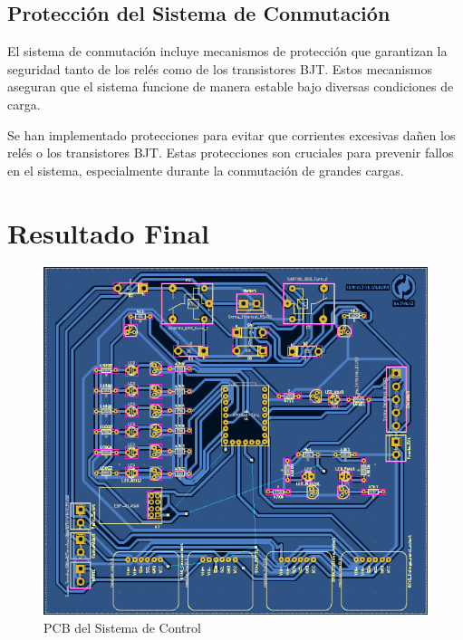             \subsection{Protección del Sistema de Conmutación}
                El sistema de conmutación incluye mecanismos de protección que garantizan la seguridad tanto de los relés como de los transistores BJT. Estos mecanismos aseguran que el sistema funcione de manera estable bajo diversas condiciones de carga.\par
                Se han implementado protecciones para evitar que corrientes excesivas dañen los relés o los transistores BJT. Estas protecciones son cruciales para prevenir fallos en el sistema, especialmente durante la conmutación de grandes cargas.\par
            
        \section{Resultado Final}
            \begin{figure}[H]
                    \centering
                    \includegraphics[width=0.8\linewidth]{Hardware/PCB.png}
                    \caption{PCB del Sistema de Control}
                    \label{fig:h1}
                \end{figure}